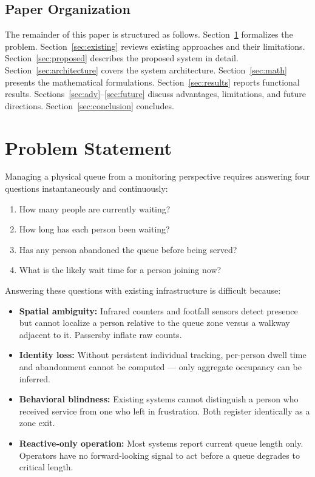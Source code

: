 \documentclass[journal, twocolumn]{IEEEtran}
\begin{document}
\subsection{Paper Organization}
The remainder of this paper is structured as follows. Section~\ref{sec:problem} formalizes the problem. Section~\ref{sec:existing} reviews existing approaches and their limitations. Section~\ref{sec:proposed} describes the proposed system in detail. Section~\ref{sec:architecture} covers the system architecture. Section~\ref{sec:math} presents the mathematical formulations. Section~\ref{sec:results} reports functional results. Sections~\ref{sec:adv}--\ref{sec:future} discuss advantages, limitations, and future directions. Section~\ref{sec:conclusion} concludes.

\section{Problem Statement}
\label{sec:problem}

Managing a physical queue from a monitoring perspective requires answering four questions instantaneously and continuously:

\begin{enumerate}
    \item How many people are currently waiting?
    \item How long has each person been waiting?
    \item Has any person abandoned the queue before being served?
    \item What is the likely wait time for a person joining now?
\end{enumerate}

Answering these questions with existing infrastructure is difficult because:

\begin{itemize}
    \item \textbf{Spatial ambiguity:} Infrared counters and footfall sensors detect presence but cannot localize a person relative to the queue zone versus a walkway adjacent to it. Passersby inflate raw counts.
    \item \textbf{Identity loss:} Without persistent individual tracking, per-person dwell time and abandonment cannot be computed — only aggregate occupancy can be inferred.
    \item \textbf{Behavioral blindness:} Existing systems cannot distinguish a person who received service from one who left in frustration. Both register identically as a zone exit.
    \item \textbf{Reactive-only operation:} Most systems report current queue length only. Operators have no forward-looking signal to act before a queue degrades to critical length.
\end{itemize}
\end{document}
